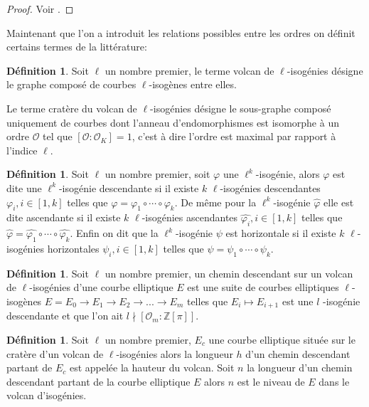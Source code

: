\documentclass[10pt,a4paper]{book}
\theoremstyle{plain}
\theoremstyle{definition}
\theoremstyle{definition}
\theoremstyle{definition}
\theoremstyle{definition}
\newtheorem{defi}[thm]{Définition}
\theoremstyle{remark}
\theoremstyle{remark}
\theoremstyle{definition}
\begin{document}
\begin{proof}
Voir \cite[§2.3]{FouquetMorain02}.
\end{proof}

Maintenant que l'on a introduit les relations possibles entre les ordres on définit certains termes de la littérature:

\begin{defi}
Soit $\ell$ un nombre premier, le terme volcan de $\ell$-isogénies désigne le graphe composé de courbes $\ell$-isogènes entre elles.

Le terme cratère du volcan de $\ell$-isogénies désigne le sous-graphe composé uniquement de courbes dont l'anneau d'endomorphismes est isomorphe à un ordre $\mathcal{O}$ tel que $[\mathcal{O}: \mathcal{O}_K]=1$, c'est à dire l'ordre est maximal par rapport à l'indice $\ell$.
\end{defi}

\begin{defi}
Soit $\ell$ un nombre premier, soit $\varphi$ une $\ell^k$-isogénie, alors $\varphi$ est dite une $\ell^k$-isogénie descendante si il existe $k$ $\ell$-isogénies descendantes $\varphi_i, i \in [1,k]$ telles que $\varphi=\varphi_1 \circ \cdots \circ \varphi_k$. De même pour la $\ell^k$-isogénie $\widehat{\varphi}$ elle est dite ascendante si il existe $k$ $\ell$-isogénies ascendantes $\widehat{\varphi_i}, i \in [1,k]$ telles que $\widehat{\varphi}=\widehat{\varphi_1} \circ \cdots \circ \widehat{\varphi_k}$. Enfin on dit que la $\ell^k$-isogénie $\psi$ est horizontale si il existe $k$ $\ell$-isogénies horizontales $\psi_i, i \in [1,k]$ telles que $\psi=\psi_1 \circ \cdots \circ \psi_k$.
\end{defi}

\begin{defi}
Soit $\ell$ un nombre premier, un chemin descendant sur un volcan de $\ell$-isogénies d'une courbe elliptique $E$ est une suite de courbes elliptiques $\ell$-isogènes $E=E_0 \rightarrow E_1 \rightarrow E_2 \rightarrow ... \rightarrow E_m$ telles que $E_i \mapsto E_{i+1}$ est une $l$ -isogénie descendante et que l'on ait $l \nmid [ \mathcal{O}_m : \mathbb{Z}[\pi]]$. 
\end{defi}

\begin{defi}
Soit $\ell$ un nombre premier, $E_c$ une courbe elliptique située sur le cratère d'un volcan de $\ell$-isogénies alors la longueur $h$ d'un chemin descendant partant de $E_c$ est appelée la hauteur du volcan.
Soit $n$ la longueur d'un chemin descendant partant de la courbe elliptique $E$ alors $n$ est le niveau de $E$ dans le volcan d'isogénies.
\end{defi}
\end{document}
